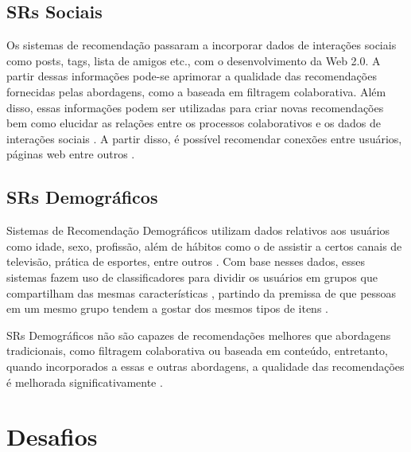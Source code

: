     \subsection{SRs Sociais}
    
    Os sistemas de recomendação passaram a incorporar dados de interações sociais como posts, tags, lista de amigos etc., com o desenvolvimento da Web 2.0. A partir dessas informações pode-se aprimorar a qualidade das recomendações fornecidas pelas abordagens, como a baseada em filtragem colaborativa. Além disso, essas informações podem ser utilizadas para criar novas recomendações bem como elucidar as relações entre os processos colaborativos e os dados de interações sociais \cite{Bobadilla_2013}. A partir disso, é possível recomendar conexões entre usuários, páginas web entre outros \cite{Aggarwal2016}.
    
    
    \subsection{SRs Demográficos}
    
    Sistemas de Recomendação Demográficos utilizam dados relativos aos usuários como idade, sexo, profissão, além de hábitos como o de assistir a certos canais de televisão, prática de esportes, entre outros \cite{Krulwich1997}. Com base nesses dados, esses sistemas fazem uso de classificadores para dividir os usuários em grupos que compartilham das mesmas características \cite{Aggarwal2016}, partindo da premissa de que pessoas em um mesmo grupo tendem a gostar dos mesmos tipos de itens \cite{Pazzani1999}. 
   
    SRs Demográficos não são capazes de recomendações melhores que abordagens tradicionais, como filtragem colaborativa ou baseada em conteúdo, entretanto, quando incorporados a essas e outras abordagens, a qualidade das recomendações é melhorada significativamente \cite{Aggarwal2016}. 

    


\section{Desafios} \label{sec:desafios}

    
